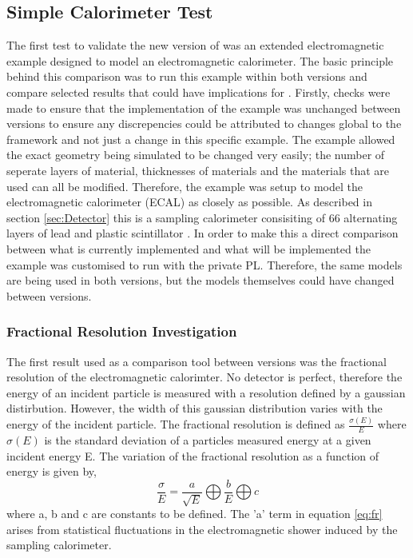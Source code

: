 \subsection{Simple Calorimeter Test}
\label{sec:Simple Calorimeter Test}
The first test to validate the new version of \geant  was an extended electromagnetic example designed to model an electromagnetic calorimeter.  The basic principle behind this comparison was to run this example within both \geant versions and compare selected results that could have implications for \lhcb.  Firstly, checks were made to ensure that the implementation of the example was unchanged between versions to ensure any discrepencies could be attributed to changes global to the \geant framework and not just a change in this specific example.  The example allowed the exact geometry being simulated to be changed very easily; the number of seperate layers of material, thicknesses of materials and the materials that are used can all be modified.  Therefore, the example was setup to model the \lhcb electromagnetic calorimeter (ECAL) as closely as possible. As described in section \ref{sec:Detector} this is a sampling calorimeter consisiting of 66 alternating layers of lead and plastic scintillator \cite{LHCb-TDR-002}. In order to make this a direct comparison between what is currently implemented and what will be implemented the example was customised to run with the \lhcb private PL.  Therefore, the same models are being used in both versions, but the models themselves could have changed between versions.

\subsubsection{Fractional Resolution Investigation}
\label{sec:Fractional Resolution Investigation}

The first result used as a comparison tool between \geant versions was the fractional resolution of the electromagnetic calorimter.  No detector is perfect, therefore the energy of an incident particle is measured with a resolution defined by a gaussian distirbution.  However, the width of this gaussian distribution varies with the energy of the incident particle.  The fractional resolution is defined as $\frac{\sigma(E)}{E}$ where $\sigma(E)$ is the standard deviation of a particles measured energy at a given incident energy E.  The variation of the fractional resolution as a function of energy is given by, 
\begin{equation}\label{eq:fr}
\frac{\sigma}{E}=\frac{a}{\sqrt{E}} \bigoplus \frac{b}{E} \bigoplus c
\end{equation}
where a, b and c are constants to be defined\cite{wigmans2000calorimetry}.  The 'a' term in equation \ref{eq:fr} arises from statistical fluctuations in the electromagnetic shower induced by the sampling calorimeter.


